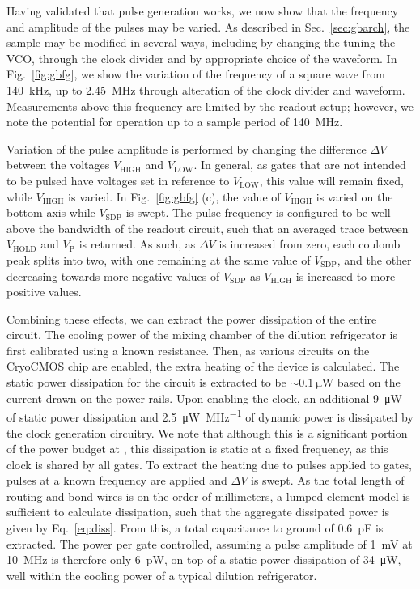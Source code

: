 Having validated that pulse generation works, we now show that the frequency and amplitude of the pulses may be varied. As described in Sec.~\ref{sec:gbarch}, the sample may be modified in several ways, including by changing the tuning the VCO, through the clock divider and by appropriate choice of the waveform. In Fig.~\ref{fig:gbfg}, we show the variation of the frequency of a square wave from \SI{140}{\kilo\hertz}, up to \SI{2.45}{\mega\hertz} through alteration of the clock divider and waveform. Measurements above this frequency are limited by the readout setup; however, we note the potential for operation up to a sample period of \SI{140}{\mega\hertz}.

Variation of the pulse amplitude is performed by changing the difference $\Delta V$ between the voltages $V_\textrm{HIGH}$ and $V_\textrm{LOW}$. In general, as gates that are not intended to be pulsed have voltages set in reference to $V_\textrm{LOW}$, this value will remain fixed, while $V_\textrm{HIGH}$ is varied. In Fig.~\ref{fig:gbfg} (c), the value of $V_\textrm{HIGH}$ is varied on the bottom axis while $V_\textrm{SDP}$ is swept. The pulse frequency is configured to be well above the bandwidth of the readout circuit, such that an averaged trace between $V_\textrm{HOLD}$ and $V_\textrm{P}$ is returned. As such, as $\Delta V$ is increased from zero, each coulomb peak splits into two, with one remaining at the same value of $V_\textrm{SDP}$, and the other decreasing towards more negative values of $V_\textrm{SDP}$ as $V_\textrm{HIGH}$ is increased to more positive values.

Combining these effects, we can extract the power dissipation of the entire circuit. The cooling power of the mixing chamber of the dilution refrigerator is first calibrated using a known resistance. Then, as various circuits on the CryoCMOS chip are enabled, the extra heating of the device is calculated. The static power dissipation for the circuit is extracted to be $\sim \SI{0.1}{\micro\watt}$ based on the current drawn on the power rails. Upon enabling the clock, an additional \SI{9}{\micro\watt} of static power dissipation and \SI[per-mode=symbol]{2.5}{\micro\watt\per\mega\hertz} of dynamic power is dissipated by the clock generation circuitry. We note that although this is a significant portion of the power budget at \si{\mk}, this dissipation is static at a fixed frequency, as this clock is shared by all gates. To extract the heating due to pulses applied to gates, pulses at a known frequency are applied and $\Delta V$ is swept. As the total length of routing and bond-wires is on the order of millimeters, a lumped element model is sufficient to calculate dissipation, such that the aggregate dissipated power is given by Eq.~\ref{eq:diss}. From this, a total capacitance to ground of \SI{0.6}{\pico\farad} is extracted. The power per gate controlled, assuming a pulse amplitude of \SI{1}{\milli\volt} at \SI{10}{\mega\hertz} is therefore only \SI{6}{\pico\watt}, on top of a static power dissipation of \SI{34}{\micro\watt}, well within the cooling power of a typical dilution refrigerator.

